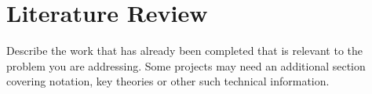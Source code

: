 \chapter{Literature Review}

Describe the work that has already been completed that is relevant to the problem you are addressing.
Some projects may need an additional section covering notation, key theories or other such technical information.